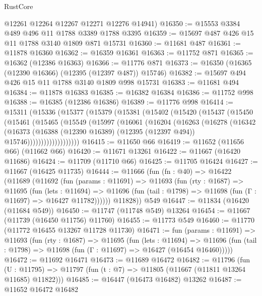 \begin{lexlean}{RustCore}
\begin{coremodule}
      @12261
      @12264
      @12267
      @12271
      @12276
      @14941)
@16350 := @15553 @3384 @489 @496 @11 @1788 @3389 @1788 @3395
@16359 := @15697 @487 @426 @15 @11 @1788 @3140 @1809 @871 @15731
@16360 := @11681 @487
@16361 := @11878 @16360
@16362 := @16359 @16361
@16363 := @11752 @871
@16365 := @16362 (@12386 @16363)
@16366 := @11776 @871
@16373 := @16350 (@16365 (@12390 @16366) (@12395 (@12397 @487)) @15746)
@16382 := @15697 @494 @426 @15 @11 @1788 @3140 @1809 @998 @15731
@16383 := @11681 @494
@16384 := @11878 @16383
@16385 := @16382 @16384
@16386 := @11752 @998
@16388 := @16385 (@12386 @16386)
@16389 := @11776 @998
@16414 := @15311
    (@15336
      (@15377
        (@15379
          (@15381
            (@15402
              (@15420
                (@15437
                  (@15450
                    (@15461
                      (@15465
                        (@15549
                          (@15997
                            (@16061
                              (@16204
                                (@16263
                                  (@16278
                                    (@16342
                                      (@16373
                                        (@16388
                                          (@12390 @16389)
                                          (@12395 (@12397 @494))
                                          @15746)))))))))))))))))))
@16415 := @11650 @66
@16419 := @11652 (@11656 @66) (@11662 @66)
@16420 := @11671 @13261
@16422 := @11667 (@16420 @11686)
@16424 := @11709 (@11710 @66)
@16425 := @11705 @16424
@16427 := @11667 (@16425 @11735)
@16444 := @11666
    (fun (fn : @40) =>
    @16422
      (@11689
        (@11692
          (fun (params : @11691) =>
          @11693
            (fun (rty : @1687) =>
            @11695
              (fun (lets : @11694) =>
              @11696 (fun (tail : @1798) => @11698 (fun (Γ : @11697) => @16427 @11782))))))
        @11828))
    @549
@16447 := @11834 (@16420 (@11684 @549))
@16450 := @11747 (@11748 @549) @13264
@16454 := @11667 (@11739 (@16450 @11756) @11760)
@16455 := @11773 @549
@16460 := @11770 (@11772 @16455 @13267 @11728 @11730)
@16471 := fun (params : @11691) =>
  @11693
    (fun (rty : @1687) =>
    @11695
      (fun (lets : @11694) =>
      @11696 (fun (tail : @1798) => @11698 (fun (Γ : @11697) => @16427 (@16454 @16460)))))
@16472 := @11692 @16471
@16473 := @11689 @16472
@16482 := @11796
    (fun (U : @11795) => @11797 (fun (t : @7) => @11805 (@11667 (@11811 @13264 @11685) @11822)))
@16485 := @16447 (@16473 @16482) @13262
@16487 := @11652 @16472 @16482

\end{coremodule}
\end{lexlean}
